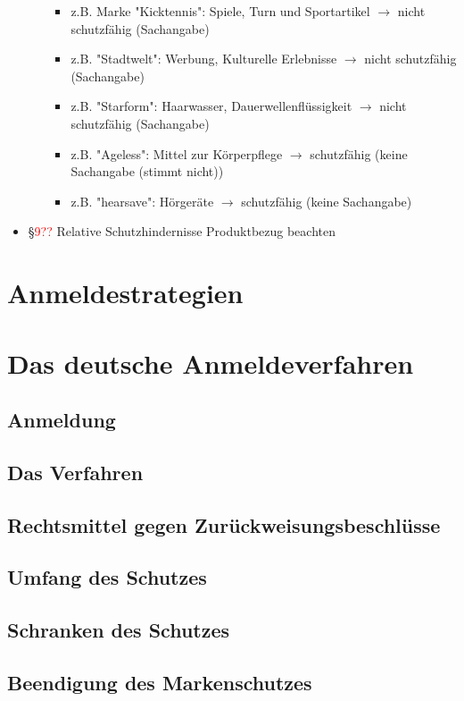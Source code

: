 \documentclass{report}
\begin{document}
\begin{itemize}
\begin{itemize}
		\begin{itemize}
			\item z.B. Marke "Kicktennis": Spiele, Turn und Sportartikel $\rightarrow$ nicht schutzfähig (Sachangabe)
			\item z.B. "Stadtwelt": Werbung, Kulturelle Erlebnisse $\rightarrow$ nicht schutzfähig (Sachangabe)
			\item z.B. "Starform": Haarwasser, Dauerwellenflüssigkeit $\rightarrow$ nicht schutzfähig (Sachangabe)
			\item z.B. "Ageless": Mittel zur Körperpflege $\rightarrow$ schutzfähig (keine Sachangabe (stimmt nicht))
			\item z.B. "hearsave": Hörgeräte $\rightarrow$ schutzfähig (keine Sachangabe)
		\end{itemize}
	\end{itemize}
	\item §\textcolor{red}{9??} Relative Schutzhindernisse
	\newline Produktbezug beachten
\end{itemize}

\section{Anmeldestrategien}
\section{Das deutsche Anmeldeverfahren}
\subsection{Anmeldung}
\subsection{Das Verfahren}
\subsection{Rechtsmittel gegen Zurückweisungsbeschlüsse}
\subsection{Umfang des Schutzes}
\subsection{Schranken des Schutzes}
\subsection{Beendigung des Markenschutzes}
\end{document}
